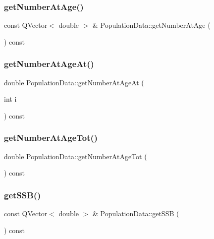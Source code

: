 \subsubsection{\texorpdfstring{getNumberAtAge()}{getNumberAtAge()}}
{\footnotesize\ttfamily const Q\+Vector$<$ double $>$ \& Population\+Data\+::get\+Number\+At\+Age (\begin{DoxyParamCaption}{ }\end{DoxyParamCaption}) const}

\mbox{\label{class_population_data_a49c67aa9f7d4b8acd16ec08f69bb9ce2}} 
\subsubsection{\texorpdfstring{getNumberAtAgeAt()}{getNumberAtAgeAt()}}
{\footnotesize\ttfamily double Population\+Data\+::get\+Number\+At\+Age\+At (\begin{DoxyParamCaption}\item[{int}]{i }\end{DoxyParamCaption}) const}

\mbox{\label{class_population_data_a9454b888f6b30f2b49082244443cc46f}} 
\subsubsection{\texorpdfstring{getNumberAtAgeTot()}{getNumberAtAgeTot()}}
{\footnotesize\ttfamily double Population\+Data\+::get\+Number\+At\+Age\+Tot (\begin{DoxyParamCaption}{ }\end{DoxyParamCaption}) const}

\mbox{\label{class_population_data_acaee2b0654f474c75883d934945f7e36}} 
\subsubsection{\texorpdfstring{getSSB()}{getSSB()}}
{\footnotesize\ttfamily const Q\+Vector$<$ double $>$ \& Population\+Data\+::get\+S\+SB (\begin{DoxyParamCaption}{ }\end{DoxyParamCaption}) const}

